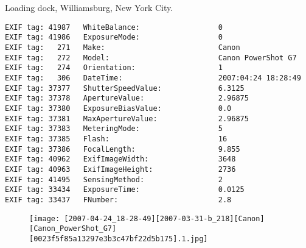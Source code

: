 \section{\protect{}}
\noindent Loading dock, Williamsburg, New York City.
\noindent
\begin{lstlisting}
EXIF tag: 41987   WhiteBalance:                  0
EXIF tag: 41986   ExposureMode:                  0
EXIF tag:   271   Make:                          Canon
EXIF tag:   272   Model:                         Canon PowerShot G7
EXIF tag:   274   Orientation:                   1
EXIF tag:   306   DateTime:                      2007:04:24 18:28:49
EXIF tag: 37377   ShutterSpeedValue:             6.3125
EXIF tag: 37378   ApertureValue:                 2.96875
EXIF tag: 37380   ExposureBiasValue:             0.0
EXIF tag: 37381   MaxApertureValue:              2.96875
EXIF tag: 37383   MeteringMode:                  5
EXIF tag: 37385   Flash:                         16
EXIF tag: 37386   FocalLength:                   9.855
EXIF tag: 40962   ExifImageWidth:                3648
EXIF tag: 40963   ExifImageHeight:               2736
EXIF tag: 41495   SensingMethod:                 2
EXIF tag: 33434   ExposureTime:                  0.0125
EXIF tag: 33437   FNumber:                       2.8

\end{lstlisting}
\clearpage
\begin{figure}
\raggedleft
\texttt{[image: [2007-04-24\_18-28-49][2007-03-31-b\_218][Canon][Canon\_PowerShot\_G7][0023f5f85a13297e3b3c47bf22d5b175].1.jpg]}
\end{figure}


\clearpage
